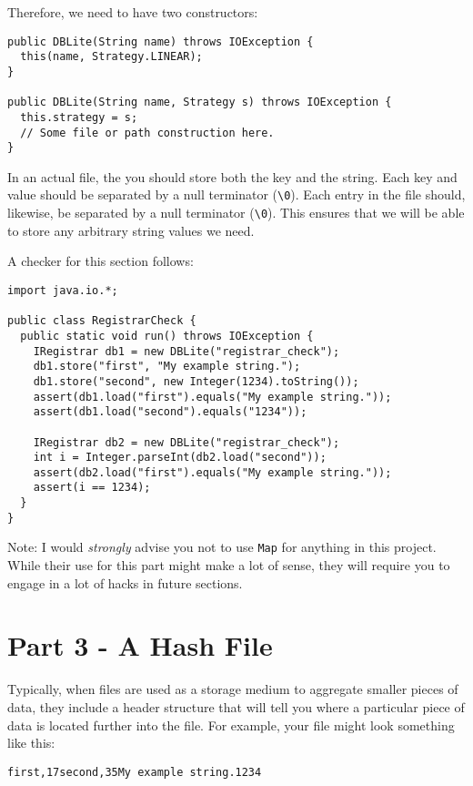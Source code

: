 \documentclass{article}
\begin{document}
Therefore, we need to have two constructors:

\begin{verbatim}
public DBLite(String name) throws IOException {
  this(name, Strategy.LINEAR);
}

public DBLite(String name, Strategy s) throws IOException {
  this.strategy = s;
  // Some file or path construction here.
}
\end{verbatim}

In an actual file, the you should store both the key and the string.  Each key
and value should be separated by a null terminator (\texttt{\textbackslash0}).
Each entry in the file should, likewise, be separated by a null terminator
(\texttt{\textbackslash0}).  This ensures that we will be able to store any
arbitrary string values we need.

A checker for this section follows:

\begin{verbatim}
import java.io.*;

public class RegistrarCheck {
  public static void run() throws IOException {
    IRegistrar db1 = new DBLite("registrar_check");
    db1.store("first", "My example string.");
    db1.store("second", new Integer(1234).toString());
    assert(db1.load("first").equals("My example string."));
    assert(db1.load("second").equals("1234"));

    IRegistrar db2 = new DBLite("registrar_check");
    int i = Integer.parseInt(db2.load("second"));
    assert(db2.load("first").equals("My example string."));
    assert(i == 1234);
  }
}
\end{verbatim}

Note: I would {\em strongly} advise you not to use \texttt{Map} for anything in
this project.  While their use for this part might make a lot of sense, they
will require you to engage in a lot of hacks in future sections.

\section*{Part 3 - A Hash File}

Typically, when files are used as a storage medium to aggregate smaller pieces
of data, they include a header structure that will tell you where a particular
piece of data is located further into the file.  For example, your file might
look something like this:

\begin{verbatim}
first,17second,35My example string.1234
\end{verbatim}
\end{document}

